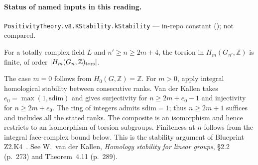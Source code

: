 

\paragraph{Status of named inputs in this reading.}
\noindent\nolinkurl{PositivityTheory.v8.KStability.kStability} --- in-repo constant (); not compared.\par

\begin{formalstatement}\label{pn:P035}
For a totally complex field \(L\) and \(n'\ge n\ge 2m+4\), the torsion
in \(H_m(G_{n'},\mathbb Z)\) is finite, of order
\(\lvert H_m(G_n,\mathbb Z)_{\rm tors}\rvert\).
\end{formalstatement}
\begin{outline}
The case \(m=0\) follows from \(H_0(G,\mathbb Z)=\mathbb Z\).
For \(m>0\), apply integral homological stability between consecutive
ranks. Van der Kallen takes \(e_0=\max(1,\mathrm{sdim})\) and gives
surjectivity for \(n\ge2m+e_0-1\) and injectivity for \(n\ge2m+e_0\).
The ring of integers admits \(\mathrm{sdim}=1\); thus \(n\ge2m+1\)
suffices and includes all the stated ranks. The composite is an isomorphism and hence restricts to
an isomorphism of torsion subgroups. Finiteness at \(n\) follows from
the integral face-complex bound below. This is the stability argument
of Blueprint Z2.K4~. See W.~van der Kallen, \emph{Homology stability
for linear groups}, \S2.2 (p.~273) and Theorem~4.11 (p.~289).
\cite{r21-vdk}
\end{outline}
